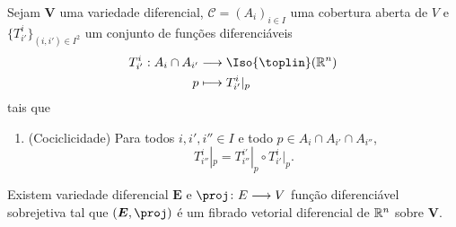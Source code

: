 \begin{prop}
Sejam $\bm V$ uma variedade diferencial, $\mathcal C = (A_i)_{i \in I}$ uma cobertura aberta de $V$ e $\{T^i_{i'}\}_{(i,i') \in I^2}$ um conjunto de funções diferenciáveis
	\begin{align*}
	\func{T^i_{i'}}{A_i \cap A_{i'}}{\Iso{\toplin}(\R^n)}{p}{T^i_{i'}|_p}
	\end{align*}
tais que
	\begin{enumerate}
%	
%	
	\item (Cociclicidade) Para todos $i,i',i'' \in I$ e todo $p \in A_i \cap A_{i'} \cap A_{i''}$,
		\begin{equation*}
		T^i_{i''}|_p = T^{i'}_{i''}|_p \circ T^i_{i'}|_p.
		\end{equation*}
	\end{enumerate}

Existem variedade diferencial $\bm E$ e $\proj\colon E \to V$ função diferenciável sobrejetiva tal que $(\bm E,\proj)$ é um fibrado vetorial diferencial de $\mathbb{R}^n$ sobre $\bm V$.
\end{prop}
